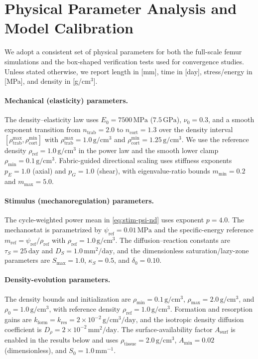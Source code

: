 \section*{Physical Parameter Analysis and Model Calibration}

We adopt a consistent set of physical parameters for both the full-scale femur simulations and the box-shaped verification tests used for convergence studies. Unless stated otherwise, we report length in [mm], time in [day], stress/energy in [MPa], and density in [g/cm$^3$].

\paragraph{Mechanical (elasticity) parameters.}
The density--elasticity law uses $E_0=7500\,\mathrm{MPa}$ ($7.5\,\mathrm{GPa}$), $\nu_0=0.3$, and a smooth exponent transition from $n_{\mathrm{trab}}=2.0$ to $n_{\mathrm{cort}}=1.3$ over the density interval $[\rho_{\mathrm{trab}}^{\max},\rho_{\mathrm{cort}}^{\min}]$ with $\rho_{\mathrm{trab}}^{\max}=1.0\,\mathrm{g/cm^3}$ and $\rho_{\mathrm{cort}}^{\min}=1.25\,\mathrm{g/cm^3}$. We use the reference density $\rho_{\mathrm{ref}}=1.0\,\mathrm{g/cm^3}$ in the power law and the smooth lower clamp $\rho_{\min}=0.1\,\mathrm{g/cm^3}$. Fabric-guided directional scaling uses stiffness exponents $p_E=1.0$ (axial) and $p_G=1.0$ (shear), with eigenvalue-ratio bounds $m_{\min}=0.2$ and $m_{\max}=5.0$.

\paragraph{Stimulus (mechanoregulation) parameters.}
The cycle-weighted power mean in \eqref{eq:stim-psi-nd} uses exponent $p=4.0$. The mechanostat is parametrized by $\psi_{\mathrm{ref}}=0.01\,\mathrm{MPa}$ and the specific-energy reference $m_{\mathrm{ref}}=\psi_{\mathrm{ref}}/\rho_{\mathrm{ref}}$ with $\rho_{\mathrm{ref}}=1.0\,\mathrm{g/cm^3}$. The diffusion--reaction constants are $\tau_S=25\,\mathrm{day}$ and $D_S=1.0\,\mathrm{mm^2/day}$, and the dimensionless saturation/lazy-zone parameters are $S_{\max}=1.0$, $\kappa_S=0.5$, and $\delta_0=0.10$.

\paragraph{Density-evolution parameters.}
The density bounds and initialization are $\rho_{\min}=0.1\,\mathrm{g/cm^3}$, $\rho_{\max}=2.0\,\mathrm{g/cm^3}$, and $\rho_0=1.0\,\mathrm{g/cm^3}$, with reference density $\rho_{\mathrm{ref}}=1.0\,\mathrm{g/cm^3}$. Formation and resorption gains are $k_{\mathrm{form}}=k_{\mathrm{res}}=2\times 10^{-2}\,\mathrm{g/cm^3/day}$, and the isotropic density diffusion coefficient is $D_\rho=2\times 10^{-2}\,\mathrm{mm^2/day}$. The surface-availability factor $A_{\mathrm{surf}}$ is enabled in the results below and uses $\rho_{\mathrm{tissue}}=2.0\,\mathrm{g/cm^3}$, $A_{\min}=0.02$ (dimensionless), and $S_0=1.0\,\mathrm{mm^{-1}}$.

